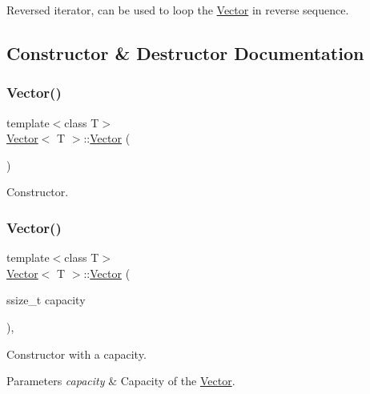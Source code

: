 Reversed iterator, can be used to loop the \hyperlink{classVector}{Vector} in reverse sequence. 

\subsection{Constructor \& Destructor Documentation}
\mbox{\label{classVector_a39d6069675db4ecfc1ab81d440da759a}} 
\subsubsection{\texorpdfstring{Vector()}{Vector()}\hspace{0.1cm}{\footnotesize\ttfamily [1/10]}}
{\footnotesize\ttfamily template$<$class T$>$ \\
\hyperlink{classVector}{Vector}$<$ T $>$\+::\hyperlink{classVector}{Vector} (\begin{DoxyParamCaption}{ }\end{DoxyParamCaption})\hspace{0.3cm}{\ttfamily [inline]}}

Constructor. \mbox{\label{classVector_a2967c34f4076209cb0663428ffd7c54d}} 
\subsubsection{\texorpdfstring{Vector()}{Vector()}\hspace{0.1cm}{\footnotesize\ttfamily [2/10]}}
{\footnotesize\ttfamily template$<$class T$>$ \\
\hyperlink{classVector}{Vector}$<$ T $>$\+::\hyperlink{classVector}{Vector} (\begin{DoxyParamCaption}\item[{ssize\+\_\+t}]{capacity }\end{DoxyParamCaption})\hspace{0.3cm}{\ttfamily [inline]}, {\ttfamily [explicit]}}

Constructor with a capacity. 
\begin{DoxyParams}{Parameters}
{\em capacity} & Capacity of the \hyperlink{classVector}{Vector}. \\
\hline
\end{DoxyParams}
\mbox{\label{classVector_a0dba46f864a228e2abde110db8a4e4d8}} 
